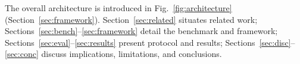 The overall architecture is introduced in Fig.~\ref{fig:architecture} (Section~\ref{sec:framework}). Section~\ref{sec:related} situates related work; Sections~\ref{sec:bench}--\ref{sec:framework} detail the benchmark and framework; Sections~\ref{sec:eval}--\ref{sec:results} present protocol and results; Sections~\ref{sec:disc}--\ref{sec:conc} discuss implications, limitations, and conclusions.
